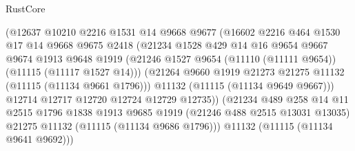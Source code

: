 \begin{lexlean}{RustCore}
\begin{coremodule}
                            (@12637
                              @10210
                              @2216
                              @1531
                              @14
                              @9668
                              @9677
                              (@16602
                                @2216
                                @464
                                @1530
                                @17
                                @14
                                @9668
                                @9675
                                @2418
                                (@21234
                                  @1528
                                  @429
                                  @14
                                  @16
                                  @9654
                                  @9667
                                  @9674
                                  @1913
                                  @9648
                                  @1919
                                  (@21246
                                    @1527
                                    @9654
                                    (@11110 (@11111 @9654))
                                    (@11115 (@11117 @1527 @14)))
                                  (@21264
                                    @9660
                                    @1919
                                    @21273
                                    @21275
                                    @11132
                                    (@11115 (@11134 @9661 @1796)))
                                  @11132
                                  (@11115 (@11134 @9649 @9667)))
                                @12714
                                @12717
                                @12720
                                @12724
                                @12729
                                @12735))
                            (@21234
                              @489
                              @258
                              @14
                              @11
                              @2515
                              @1796
                              @1838
                              @1913
                              @9685
                              @1919
                              (@21246 @488 @2515 @13031 @13035)
                              @21275
                              @11132
                              (@11115 (@11134 @9686 @1796)))
                            @11132
                            (@11115 (@11134 @9641 @9692)))

\end{coremodule}
\end{lexlean}
